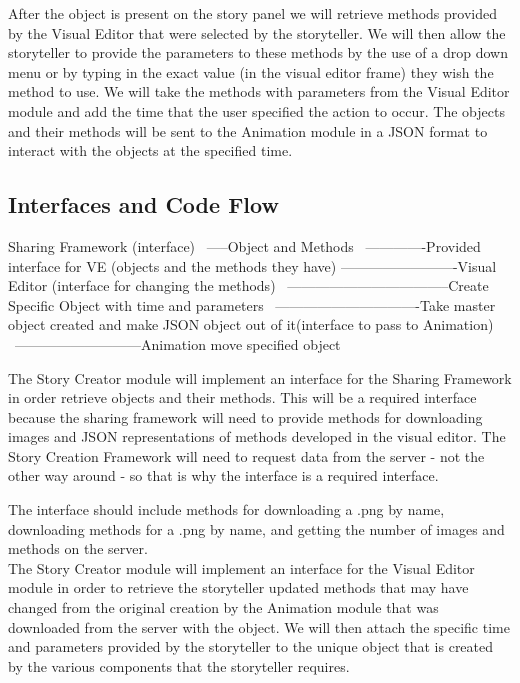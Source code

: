 \documentclass[12pt]{article}
\begin{document}
After the object is present on the story panel we will retrieve methods provided by the Visual Editor that were selected by the storyteller.  We will then allow the storyteller to provide the parameters to these methods by the use of a drop down menu or by typing in the exact value (in the visual editor frame) they wish the method to use.  We will take the methods with parameters from the Visual Editor module and add the time that the user specified the action to occur.  The objects and their methods will be sent to the Animation module in a JSON format to interact with the objects at the specified time.  \\

\subsection{Interfaces and Code Flow}
Sharing Framework (interface) \ 
-----Object and Methods \
-------------Provided interface for VE (objects and the methods they have)
-------------------------Visual Editor (interface for changing the methods) \ 
-----------------------------------Create Specific Object with time and parameters \
-------------------------------Take master object created and make JSON object out of it(interface to pass to Animation)  \
---------------------------Animation move specified object \



The Story Creator module will implement an interface for the Sharing Framework in order retrieve objects and their methods.  This will be a required interface because the sharing framework will need to provide methods for downloading images and JSON representations of methods developed in the visual editor. The Story Creation Framework will need to request data from the server - not the other way around - so that is why the interface is a required interface.

The interface should include methods for downloading a .png by name, downloading methods for a .png by name, and getting the number of images and methods on the server.  \\

The Story Creator module will implement an interface for the Visual Editor module in order to retrieve the storyteller updated methods that may have changed from the original creation by the Animation module that was downloaded from the server with the object.  We will then attach the specific time and parameters provided by the storyteller to the unique object that is created by   the various components that the storyteller requires. \\ 
\end{document}
